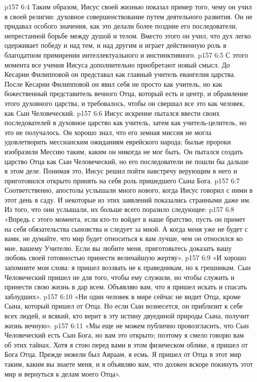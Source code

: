 \vs p157 6:4 Таким образом, Иисус своей жизнью показал пример того, чему он учил в своей религии: духовное совершенствование путем деятельного развития. Он не придавал особого значения, как это делали более поздние его последователи, непрестанной борьбе между душой и телом. Вместо этого он учил, что дух легко одерживает победу и над тем, и над другим и играет действенную роль в благодатном примирении интеллектуального и инстинктивного.
\vs p157 6:5 \pc С этого момента все учения Иисуса дополнительно приобретают новый смысл. До Кесарии Филипповой он представал как главный учитель евангелия царства. После Кесарии Филипповой он явил себя не просто как учитель, но как божественный представитель вечного Отца, который есть и центр, и обрамление этого духовного царства, и требовалось, чтобы он свершал все это как человек, как Сын Человеческий.
\vs p157 6:6 Иисус искренне пытался ввести своих последователей в духовное царство как учитель, затем как учитель\hyp{}целитель, но это не получалось. Он хорошо знал, что его земная миссия не могла удовлетворить мессианским ожиданиям еврейского народа; былые пророки изобразили Мессию таким, каким он никогда не мог быть. Он пытался создать царство Отца как Сын Человеческий, но его последователи не пошли бы дальше в этом деле. Понимая это, Иисус решил пойти навстречу верующим в него и приготовился открыто принять на себя роль пришедшего Сына Бога.
\vs p157 6:7 Соответственно, апостолы услышали много нового, когда Иисус говорил с ними в этот день в саду. И некоторые из этих заявлений показались странными даже им. Из того, что они услышали, их больше всего поразило следующее:
\vs p157 6:8 \pc «Впредь с этого момента, если кто\hyp{}то войдет в наше братство, пусть он примет на себя обязательства сыновства и следует за мной. А когда меня уже не будет с вами, не думайте, что мир будет относиться к вам лучше, чем он относился ко мне, вашему Учителю. Если вы любите меня, приготовьтесь доказать вашу любовь своей готовностью принести величайшую жертву».
\vs p157 6:9 \pc «И хорошо запомните мои слова: я пришел воззвать не к праведникам, но к грешникам. Сын Человеческий пришел не для того, чтобы ему служили, но чтобы служить и принести свою жизнь в дар всем. Объявляю вам, что я пришел искать и спасать заблудших».
\vs p157 6:10 \pc «Ни один человек в мире сейчас не видит Отца, кроме Сына, который пришел от Отца. Но если Сын вознесется, он приблизит к себе всех людей, и всякий, кто верит в эту истину двуединой природы Сына, получит жизнь вечную».
\vs p157 6:11 \pc «Мы еще не можем публично провозгласить, что Сын Человеческий есть Сын Бога, но вам это открыто; поэтому я смело говорю вам об этих тайнах. Хотя я стою перед вами в этом физическом облике, я пришел от Бога Отца. Прежде нежели был Авраам, я есмь. Я пришел от Отца в этот мир таким, каким вы знаете меня, и я объявляю вам, что должен вскоре покинуть этот мир и вернуться к делам моего Отца».
